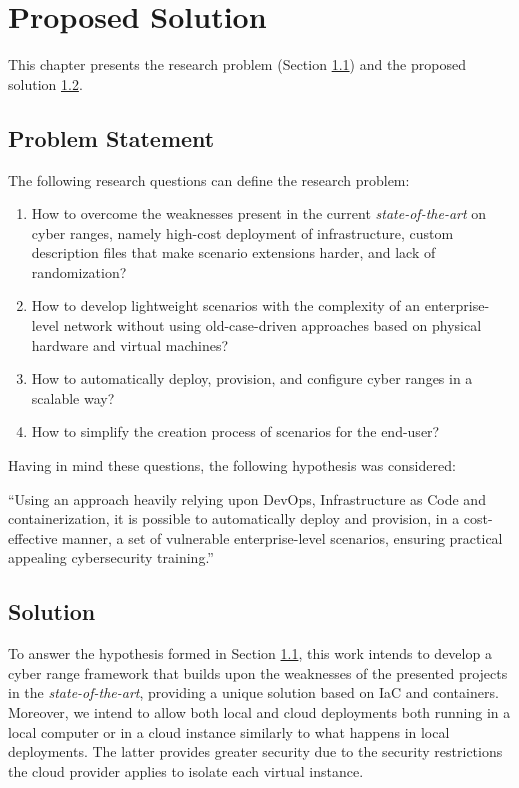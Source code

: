 \chapter{Proposed Solution}\label{chap:proposed_solution}

\minitoc

This chapter presents the research problem (Section \ref{sec:research_problem}) and the proposed solution \ref{sec:solution}. 

\section{Problem Statement} \label{sec:research_problem}

The following research questions can define the research problem:

\begin{enumerate}
    \item How to overcome the weaknesses present in the current \textit{state-of-the-art} on cyber ranges, namely high-cost deployment of infrastructure, custom description files that make scenario extensions harder, and lack of randomization? 
    \item How to develop lightweight scenarios with the complexity of an enterprise-level network without using old-case-driven approaches based on physical hardware and virtual machines?
    \item How to automatically deploy, provision, and configure cyber ranges in a scalable way?
    \item How to simplify the creation process of scenarios for the end-user?
\end{enumerate}

Having in mind these questions, the following hypothesis was considered:

``Using an approach heavily relying upon DevOps, Infrastructure as Code and containerization, it is possible to automatically deploy and provision, in a cost-effective manner, a set of vulnerable enterprise-level scenarios, ensuring practical appealing cybersecurity training.''

\section{Solution} \label{sec:solution}

To answer the hypothesis formed in Section \ref{sec:research_problem}, this work intends to develop a cyber range framework that builds upon the weaknesses of the presented projects in the \textit{state-of-the-art}, providing a unique solution based on IaC and containers. Moreover, we intend to allow both local and cloud deployments both running in a local computer or in a cloud instance similarly to what happens in local deployments. The latter provides greater security due to the security restrictions the cloud provider applies to isolate each virtual instance.  

